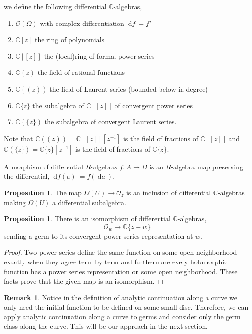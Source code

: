 \documentclass[12pt]{extarticle}
\newcommand{\C}{\mathbb{C}}
\renewcommand{\d}[1]{\: \mathrm{d}#1 \:}
\theoremstyle{definition}
\newtheorem{proposition}[theorem]{Proposition}
\newtheorem{remark}{Remark}
\newenvironment{definition}[1][Definition:]{\begin{trivlist}
\item[\hskip \labelsep {\bfseries #1}]}{\end{trivlist}}
\renewcommand{\O}{\mathcal{O}}
\begin{document}
\begin{definition}
we define the following differential $\C$-algebras,
\begin{enumerate}
\item $\O(\Omega)$ with complex differentiation $\d{f} = f'$
\item $\C[z]$ the ring of polynomials
\item $\C[[z]]$ the (local)ring of formal power series
\item $\C(z)$ the field of rational functions
\item $\C((z))$ the field of Laurent series (bounded below in degree) 
\item $\C\{ z \}$ the subalgebra of $\C[[z]]$ of convergent power series
\item $\C(\{ z \})$ the subalgebra of convergent Laurent series.
\end{enumerate}
Note that $\C((z)) = \C[[z]][z^{-1}]$ is the field of fractions of $\C[[z]]$ and $\C( \{ z \}) = \C\{ z \}[z^{-1}]$ is the field of fractions of $\C\{z \}$. 
\end{definition}

\begin{definition}
A morphism of differential $R$-algebras $f : A \to B$ is an $R$-algebra map preserving the differential, $\d{f(a)} = f(\d{a})$. 
\end{definition}

\begin{proposition}
The map $\Omega(U) \to \O_z$ is an inclusion of differential $\C$-algebras making $\Omega(U)$ a differential subalgebra. 
\end{proposition}

\begin{proposition}
There is an isomorphism of differential $\C$-algebras,
\[ \O_w \to \C\{ z - w \} \]
sending a germ to its convergent power series representation at $w$. 
\end{proposition}

\begin{proof}
Two power series define the same function on some open neighborhood exactly when they agree term by term and furthermore every holomorphic function has a power series representation on some open neighborhood. These facts prove that the given map is an isomorphism. 
\end{proof}

\begin{remark}
Notice in the definition of analytic continuation along a curve we only need the initial function to be defined on some small disc. Therefore, we can apply analytic continuation along a curve to germs and consider only the germ class along the curve. This will be our approach in the next section.
\end{remark}
\end{document}
